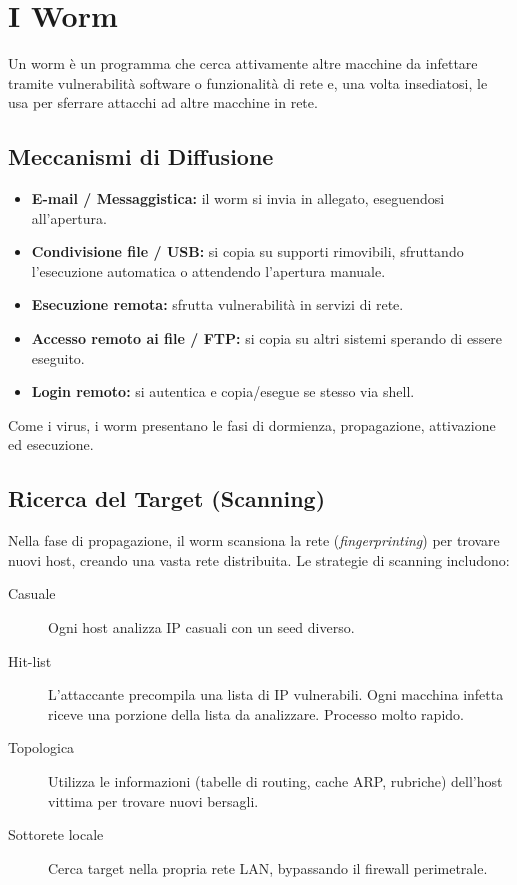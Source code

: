 \section{I Worm}

Un worm è un programma che cerca attivamente altre macchine da infettare tramite vulnerabilità software o funzionalità di rete e, una volta insediatosi, le usa per sferrare attacchi ad altre macchine in rete.

\subsection{Meccanismi di Diffusione}
\begin{itemize}
    \item \textbf{E-mail / Messaggistica:} il worm si invia in allegato, eseguendosi all'apertura.
    \item \textbf{Condivisione file / USB:} si copia su supporti rimovibili, sfruttando l'esecuzione automatica o attendendo l'apertura manuale.
    \item \textbf{Esecuzione remota:} sfrutta vulnerabilità in servizi di rete.
    \item \textbf{Accesso remoto ai file / FTP:} si copia su altri sistemi sperando di essere eseguito.
    \item \textbf{Login remoto:} si autentica e copia/esegue se stesso via shell.
\end{itemize}
Come i virus, i worm presentano le fasi di dormienza, propagazione, attivazione ed esecuzione.

\subsection{Ricerca del Target (Scanning)}

Nella fase di propagazione, il worm scansiona la rete (\textit{fingerprinting}) per trovare nuovi host, creando una vasta rete distribuita. Le strategie di scanning includono:
\begin{description}
    \item[Casuale] Ogni host analizza IP casuali con un seed diverso.
    \item[Hit-list] L'attaccante precompila una lista di IP vulnerabili. Ogni macchina infetta riceve una porzione della lista da analizzare. Processo molto rapido.
    \item[Topologica] Utilizza le informazioni (tabelle di routing, cache ARP, rubriche) dell'host vittima per trovare nuovi bersagli.
    \item[Sottorete locale] Cerca target nella propria rete LAN, bypassando il firewall perimetrale.
\end{description}

